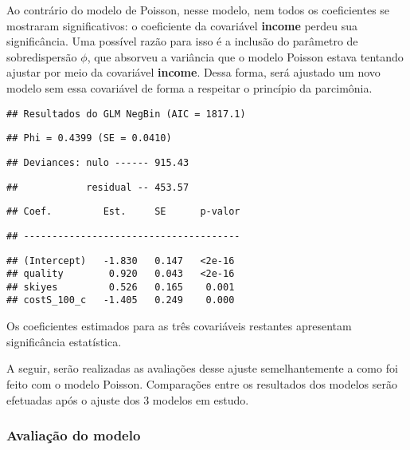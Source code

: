 \documentclass[
  twocolumn]{article}
\begin{document}
Ao contrário do modelo de Poisson, nesse modelo, nem todos os
coeficientes se mostraram significativos: o coeficiente da covariável
\textbf{income} perdeu sua significância. Uma possível razão para isso é
a inclusão do parâmetro de sobredispersão \(\phi\), que absorveu a
variância que o modelo Poisson estava tentando ajustar por meio da
covariável \textbf{income}. Dessa forma, será ajustado um novo modelo
sem essa covariável de forma a respeitar o princípio da parcimônia.

\vspace{3cm}

\begin{verbatim}
## Resultados do GLM NegBin (AIC = 1817.1)
\end{verbatim}

\begin{verbatim}
## Phi = 0.4399 (SE = 0.0410)
\end{verbatim}

\begin{verbatim}
## Deviances: nulo ------ 915.43
\end{verbatim}

\begin{verbatim}
##            residual -- 453.57
\end{verbatim}

\begin{verbatim}
## Coef.         Est.     SE      p-valor
\end{verbatim}

\begin{verbatim}
## --------------------------------------
\end{verbatim}

\begin{verbatim}
## (Intercept)   -1.830   0.147   <2e-16
## quality        0.920   0.043   <2e-16
## skiyes         0.526   0.165    0.001
## costS_100_c   -1.405   0.249    0.000
\end{verbatim}

Os coeficientes estimados para as três covariáveis restantes apresentam
significância estatística.

A seguir, serão realizadas as avaliações desse ajuste semelhantemente a
como foi feito com o modelo Poisson. Comparações entre os resultados dos
modelos serão efetuadas após o ajuste dos 3 modelos em estudo.

\subsubsection{Avaliação do modelo}\label{avaliauxe7uxe3o-do-modelo-1}
\end{document}
